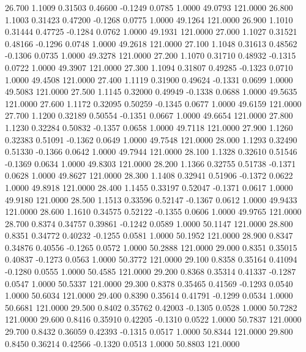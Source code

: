   26.700   1.1009   0.31503   0.46600  -0.1249   0.0785   1.0000  49.0793 121.0000
  26.800   1.1003   0.31423   0.47200  -0.1268   0.0775   1.0000  49.1264 121.0000
  26.900   1.1010   0.31444   0.47725  -0.1284   0.0762   1.0000  49.1931 121.0000
  27.000   1.1027   0.31521   0.48166  -0.1296   0.0748   1.0000  49.2618 121.0000
  27.100   1.1048   0.31613   0.48562  -0.1306   0.0735   1.0000  49.3278 121.0000
  27.200   1.1070   0.31710   0.48932  -0.1315   0.0722   1.0000  49.3907 121.0000
  27.300   1.1094   0.31807   0.49285  -0.1323   0.0710   1.0000  49.4508 121.0000
  27.400   1.1119   0.31900   0.49624  -0.1331   0.0699   1.0000  49.5083 121.0000
  27.500   1.1145   0.32000   0.49949  -0.1338   0.0688   1.0000  49.5635 121.0000
  27.600   1.1172   0.32095   0.50259  -0.1345   0.0677   1.0000  49.6159 121.0000
  27.700   1.1200   0.32189   0.50554  -0.1351   0.0667   1.0000  49.6654 121.0000
  27.800   1.1230   0.32284   0.50832  -0.1357   0.0658   1.0000  49.7118 121.0000
  27.900   1.1260   0.32383   0.51091  -0.1362   0.0649   1.0000  49.7548 121.0000
  28.000   1.1293   0.32490   0.51330  -0.1366   0.0642   1.0000  49.7944 121.0000
  28.100   1.1328   0.32610   0.51546  -0.1369   0.0634   1.0000  49.8303 121.0000
  28.200   1.1366   0.32755   0.51738  -0.1371   0.0628   1.0000  49.8627 121.0000
  28.300   1.1408   0.32941   0.51906  -0.1372   0.0622   1.0000  49.8918 121.0000
  28.400   1.1455   0.33197   0.52047  -0.1371   0.0617   1.0000  49.9180 121.0000
  28.500   1.1513   0.33596   0.52147  -0.1367   0.0612   1.0000  49.9433 121.0000
  28.600   1.1610   0.34575   0.52122  -0.1355   0.0606   1.0000  49.9765 121.0000
  28.700   0.8374   0.34757   0.39861  -0.1242   0.0589   1.0000  50.1147 121.0000
  28.800   0.8351   0.34772   0.40232  -0.1255   0.0581   1.0000  50.1952 121.0000
  28.900   0.8347   0.34876   0.40556  -0.1265   0.0572   1.0000  50.2888 121.0000
  29.000   0.8351   0.35015   0.40837  -0.1273   0.0563   1.0000  50.3772 121.0000
  29.100   0.8358   0.35164   0.41094  -0.1280   0.0555   1.0000  50.4585 121.0000
  29.200   0.8368   0.35314   0.41337  -0.1287   0.0547   1.0000  50.5337 121.0000
  29.300   0.8378   0.35465   0.41569  -0.1293   0.0540   1.0000  50.6034 121.0000
  29.400   0.8390   0.35614   0.41791  -0.1299   0.0534   1.0000  50.6681 121.0000
  29.500   0.8402   0.35762   0.42003  -0.1305   0.0528   1.0000  50.7282 121.0000
  29.600   0.8416   0.35910   0.42205  -0.1310   0.0522   1.0000  50.7837 121.0000
  29.700   0.8432   0.36059   0.42393  -0.1315   0.0517   1.0000  50.8344 121.0000
  29.800   0.8450   0.36214   0.42566  -0.1320   0.0513   1.0000  50.8803 121.0000
